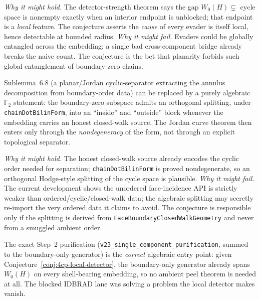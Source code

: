 \noindent\emph{Why it might hold.} The detector-strength theorem says the gap
$W_0(H)\subsetneq$ cycle space is nonempty exactly when an interior endpoint is
unblocked; that endpoint is a \emph{local} feature. The conjecture asserts the
\emph{cause} of every evader is itself local, hence detectable at bounded
radius. \emph{Why it might fail.} Evaders could be globally entangled across the
embedding; a single bad cross-component bridge already breaks the naive count.
The conjecture is the bet that planarity forbids such global entanglement of
boundary-zero chains.

\begin{conjecture}
\label{conj:4cp-jordan}
Sublemma~6.8 (a planar/Jordan cyclic-separator extracting the annulus
decomposition from boundary-order data) can be replaced by a purely algebraic
$\mathbb{F}_2$ statement: the boundary-zero subspace admits an orthogonal
splitting, under \verb|chainDotBilinForm|, into an ``inside'' and ``outside''
block whenever the embedding carries an honest closed-walk source. The Jordan
curve theorem then enters only through the \emph{nondegeneracy} of the form, not
through an explicit topological separator.
\end{conjecture}

\noindent\emph{Why it might hold.} The honest closed-walk source already encodes
the cyclic order needed for separation; \verb|chainDotBilinForm| is proved
nondegenerate, so an orthogonal Hodge-style splitting of the cycle space is
plausible. \emph{Why it might fail.} The current development shows the unordered
face-incidence API is strictly weaker than ordered/cyclic/closed-walk data; the
algebraic splitting may secretly re-import the very ordered data it claims to
avoid. The conjecture is responsible only if the splitting is derived from
\verb|FaceBoundaryClosedWalkGeometry| and never from a smuggled ambient order.

\begin{conjecture}
\label{conj:4cp-purification}
The exact Step~2 purification
(\verb|v23_single_component_purification|, summed to the boundary-only
generator) is the \emph{correct} algebraic entry point: given
Conjecture~\ref{conj:4cp-local-detector}, the boundary-only generator already
spans $W_0(H)$ on every shell-bearing embedding, so no ambient peel theorem is
needed at all. The blocked IDBRAD lane was solving a problem the local detector
makes vanish.
\end{conjecture}

